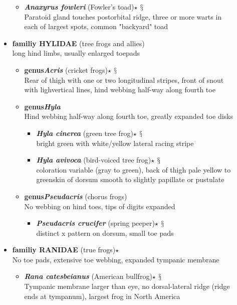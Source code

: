 \documentclass[a4paper,12pt]{article}
\begin{document}
\begin{description}
\begin{itemize}
  \begin{itemize}
      \item{\textbf{\textit{Anaxyrus fowleri}} (Fowler's toad)$\star$ $\mathsection$} \\ Paratoid gland touches postorbital ridge, three or more warts in each of largest spots, common "backyard" toad
  \end{itemize}
  \item{\textbf{familiy HYLIDAE} (tree frogs and allies)} \\ long hind limbs, usually enlarged toepads
  \begin{itemize}
    \item{\textbf{genus\textit{Acris}} (cricket frogs)$\star$ $\mathsection$} \\ Rear of thigh with one or two longitudinal stripes, front of snout with lighvertical lines, hind webbing half-way along fourth toe
    \item{\textbf{genus\textit{Hyla}}} \\ Hind webbing half-way along fourth toe, greatly expanded toe disks
    \begin{itemize}
      \item{\textbf{\textit{Hyla cinerea}} (green tree frog)$\star$ $\mathsection$} \\ bright green with white/yellow lateral racing stripe
      \item{\textbf{\textit{Hyla avivoca}} (bird-voiced tree frog)$\star$ $\mathsection$} \\ coloration variable (gray to green), back of thigh pale yellow to greenskin of dorsum smooth to slightly papillate or pustulate
    \end{itemize}
    \item{\textbf{genus\textit{Pseudacris}} (chorus frogs)} \\ No webbing on hind toes, tips of digits expanded
    \begin{itemize}
      \item{\textbf{\textit{Pseudacris crucifer}} (spring peeper)$\star$ $\mathsection$} \\ distinct x pattern on dorsum, small toe pads
    \end{itemize}
  \end{itemize}
  \item{\textbf{familiy RANIDAE} (true frogs)$\star$} \\ No toe pads, extensive toe webbing, expanded tympanic membrane
  \begin{itemize}
    \item{\textbf{\textit{Rana catesbeianus}} (American bullfrog)$\star$ $\mathsection$} \\ Tympanic membrane larger than eye, no dorsal-lateral ridge (ridge ends at tympanum), largest frog in North America

\end{itemize}
\end{itemize}
\end{description}
\end{document}
